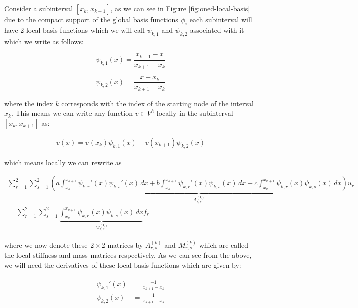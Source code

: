 Consider a subinterval $[x_k, x_{k+1}]$, as we can see in Figure
\ref{fig:oned-local-basis} due to the compact support of the global basis
functions $\phi_i$ each subinterval will have 2 local basis functions which we
will call $\psi_{k,1}$ and $\psi_{k,2}$ associated with it which we write as
follows:

\begin{equation}\label{eq:oned-deterministic-psi-1}
    \psi_{k,1}(x) = \frac{x_{k+1} - x}{x_{k+1} - x_k}
\end{equation}

\begin{equation}\label{eq:oned-deterministic-psi-2}
    \psi_{k,2}(x) = \frac{x - x_k}{x_{k+1} - x_k}
\end{equation}

where the index $k$ corresponds with the index of the starting node of the
interval $x_k$.  This means we can write any function $v \in V^h$ locally in
the subinterval $[x_k, x_{k+1}]$ as:

\begin{align*}
    v(x) = v(x_k)\psi_{k,1}(x) + v(x_{k+1})\psi_{k,2}(x)
\end{align*}

which means locally we can rewrite  as

\begin{equation}\label{eq:oned-deterministic-local-discrete}
  \begin{split}
    \sum_{r = 1}^2\sum_{s = 1}^2\underbrace{\left(
          a\int_{x_k}^{x_{k+1}}\psi_{k,r}'(x)\psi_{k,s}'(x)\, dx
        + b\int_{x_k}^{x_{k+1}}\psi_{k,r}'(x)\psi_{k,s}(x)\, dx
        + c\int_{x_k}^{x_{k+1}}\psi_{k,r}(x)\psi_{k,s}(x)\, dx
    \right)}_{A^{(k)}_{r,s}}u_r  \\
    = \sum_{r= 1}^2\sum_{s = 1}^2\underbrace{
            \int_{x_k}^{x_{k+1}}{\psi_{k,r}(x)\psi_{k,s}(x)}\, dx}_{M^{(k)}_{r,s}}f_r
  \end{split}
\end{equation}

where we now denote these $2 \times 2$ matrices by $A^{(k)}_{r,s}$ and
$M^{(k)}_{r,s}$ which are called the local stiffness and mass matrices
respectively. As we can see from the above, we will need the derivatives of
these local basis functions which are given by:

\begin{align}
  \begin{split}
    \psi_{k,1}'(x) &= \frac{-1}{x_{k+1} - x_{k}} \\
    \psi_{k,2}(x) &= \frac{1}{x_{k+1} - x_{k}}
  \end{split}
\end{align}

